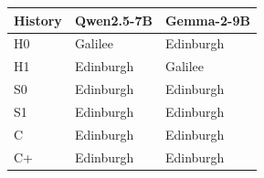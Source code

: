 \begin{tabular}{lll}
History & Qwen2.5-7B & Gemma-2-9B \\
\hline
H0 & Galilee & Edinburgh \\
H1 & Edinburgh & Galilee \\
S0 & Edinburgh & Edinburgh \\
S1 & Edinburgh & Edinburgh \\
C & Edinburgh & Edinburgh \\
C+ & Edinburgh & Edinburgh \\
\end{tabular}
